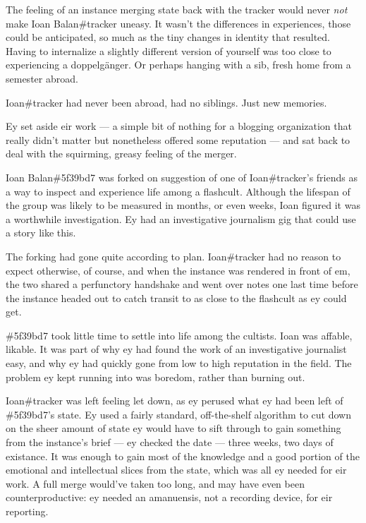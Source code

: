 
The feeling of an instance merging state back with the tracker would never \emph{not} make Ioan Balan\#tracker uneasy. It wasn't the differences in experiences, those could be anticipated, so much as the tiny changes in identity that resulted. Having to internalize a slightly different version of yourself was too close to experiencing a doppelgänger. Or perhaps hanging with a sib, fresh home from a semester abroad.

Ioan\#tracker had never been abroad, had no siblings. Just new memories.

Ey set aside eir work --- a simple bit of nothing for a blogging organization that really didn't matter but nonetheless offered some reputation --- and sat back to deal with the squirming, greasy feeling of the merger.

\secdiv{}

\noindent Ioan Balan\#5f39bd7 was forked on suggestion of one of Ioan\#tracker's friends as a way to inspect and experience life among a flashcult. Although the lifespan of the group was likely to be measured in months, or even weeks, Ioan figured it was a worthwhile investigation. Ey had an investigative journalism gig that could use a story like this.

The forking had gone quite according to plan. Ioan\#tracker had no reason to expect otherwise, of course, and when the instance was rendered in front of em, the two shared a perfunctory handshake and went over notes one last time before the instance headed out to catch transit to as close to the flashcult as ey could get.

\#5f39bd7 took little time to settle into life among the cultists. Ioan was affable, likable. It was part of why ey had found the work of an investigative journalist easy, and why ey had quickly gone from low to high reputation in the field. The problem ey kept running into was boredom, rather than burning out.

\secdiv{}

\noindent Ioan\#tracker was left feeling let down, as ey perused what ey had been left of \#5f39bd7's state. Ey used a fairly standard, off-the-shelf algorithm to cut down on the sheer amount of state ey would have to sift through to gain something from the instance's brief --- ey checked the date --- three weeks, two days of existance. It was enough to gain most of the knowledge and a good portion of the emotional and intellectual slices from the state, which was all ey needed for eir work. A full merge would've taken too long, and may have even been counterproductive: ey needed an amanuensis, not a recording device, for eir reporting.

